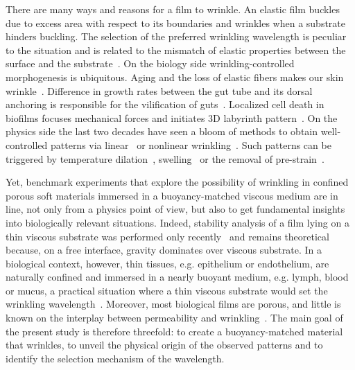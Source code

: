 \documentclass[twocolumn,superscriptaddress,showpacs,preprintnumbers, amsmath,amssymb,prl]{revtex4-1}
\begin{document}
There are many ways and reasons for a film to wrinkle. An elastic film buckles due to excess area with respect to its boundaries and wrinkles when a substrate hinders buckling. The selection of the preferred wrinkling wavelength is peculiar to the situation and is related to the mismatch of elastic properties between the surface and the substrate~\cite{Gough1940, Bijlaard1946, Biot1957, Bowden1998, Cerda2003, Genzer2006}. On the biology side wrinkling-controlled morphogenesis is ubiquitous. Aging and the loss of elastic fibers makes our skin wrinkle~\cite{Bissett1987, Genzer2006}. Difference in growth rates between the gut tube and its dorsal anchoring is responsible for the vilification of guts~\cite{Savin2011, Ciarletta2014, Shyer2013}. Localized cell death in biofilms focuses mechanical forces and initiates 3D labyrinth pattern~\cite{Trejo2013, Asally2012}. On the physics side the last two decades have seen a bloom of methods to obtain well-controlled patterns via linear~\cite{Bowden1998, Genzer2006, Hu1998, Kim2010, Vandeparre2011, Li2013} or nonlinear wrinkling~\cite{Efimenko2005, Guvendiren2010, Kim2011a, Brau2011}. Such patterns can be triggered by temperature dilation~\cite{Bowden1998}, swelling~\cite{Hu1998,Kim2010} or the removal of pre-strain~\cite{Genzer2006}. 



Yet, benchmark experiments that explore the possibility of wrinkling in confined porous soft materials immersed in a buoyancy-matched viscous medium are in line, not only from a physics point of view, but also to get fundamental insights into biologically relevant situations. Indeed, stability analysis of a film lying on a thin viscous substrate was performed only recently~\cite{Huang2002} and remains theoretical because, on a free interface, gravity dominates over viscous substrate. In a biological context, however, thin tissues, e.g. epithelium or endothelium, are naturally confined and immersed in a nearly buoyant medium, e.g. lymph, blood or mucus, a practical situation where a thin viscous substrate would set the wrinkling wavelength~\cite{Fleury2015}. Moreover, most biological films are porous, and little is known on the interplay between permeability and wrinkling~\cite{Ma2004,Longley2013}. The main goal of the present study is therefore threefold: to create a buoyancy-matched material that wrinkles, to unveil the physical origin of the observed patterns and to identify the selection mechanism of the wavelength.
\end{document}
